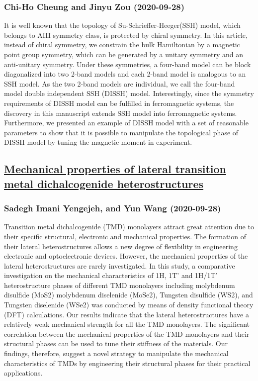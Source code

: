 \subsubsection*{Chi-Ho Cheung and Jinyu Zou (2020-09-28)}
It is well known that the topology of Su-Schrieffer-Heeger(SSH) model, which
belongs to AIII symmetry class, is protected by chiral symmetry. In this
article, instead of chiral symmetry, we constrain the bulk Hamiltonian by a
magnetic point group symmetry, which can be generated by a unitary symmetry and
an anti-unitary symmetry. Under these symmetries, a four-band model can be
block diagonalized into two 2-band models and each 2-band model is analogous to
an SSH model. As the two 2-band models are individual, we call the four-band
model double independent SSH (DISSH) model. Interestingly, since the symmetry
requirements of DISSH model can be fulfilled in ferromagnetic systems, the
discovery in this manuscript extends SSH model into ferromagnetic systems.
Furthermore, we presented an example of DISSH model with a set of reasonable
parameters to show that it is possible to manipulate the topological phase of
DISSH model by tuning the magnetic moment in experiment.

\subsection*{\href{http://arxiv.org/abs/2009.13031v1}{Mechanical properties of lateral transition metal dichalcogenide  heterostructures}}
\subsubsection*{Sadegh Imani Yengejeh, and Yun Wang (2020-09-28)}
Transition metal dichalcogenide (TMD) monolayers attract great attention due
to their specific structural, electronic and mechanical properties. The
formation of their lateral heterostructures allows a new degree of flexibility
in engineering electronic and optoelectronic devices. However, the mechanical
properties of the lateral heterostructures are rarely investigated. In this
study, a comparative investigation on the mechanical characteristics of 1H, 1T'
and 1H/1T' heterostructure phases of different TMD monolayers including
molybdenum disulfide (MoS2) molybdenum diselenide (MoSe2), Tungsten disulfide
(WS2), and Tungsten diselenide (WSe2) was conducted by means of density
functional theory (DFT) calculations. Our results indicate that the lateral
heterostructures have a relatively weak mechanical strength for all the TMD
monolayers. The significant correlation between the mechanical properties of
the TMD monolayers and their structural phases can be used to tune their
stiffness of the materials. Our findings, therefore, suggest a novel strategy
to manipulate the mechanical characteristics of TMDs by engineering their
structural phases for their practical applications.

